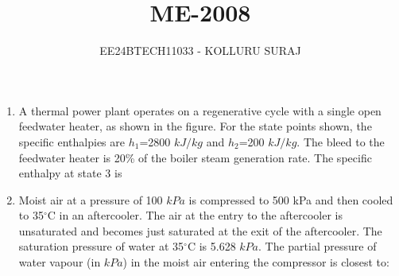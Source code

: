\documentclass[journal]{IEEEtran}
\numberwithin{equation}{enumi}
\numberwithin{figure}{enumi}
\begin{document}

\title{ME-2008}
\author{EE24BTECH11033 - KOLLURU SURAJ}
{\let\newpage\relax\maketitle}
\begin{enumerate}
\item A thermal power plant operates on a regenerative cycle with a single open feedwater heater, as shown in the figure. For the state points shown, the specific enthalpies are $h_1$=2800 $kJ/kg$ and $h_2$=200 $kJ/kg$. The bleed to the feedwater heater is 20\% of the boiler steam generation rate. The specific enthalpy at state 3 is
\hfill{}

\begin{enumerate}
\end{enumerate}
 
 \item Moist air at a pressure of 100 $kPa$ is compressed to 500 kPa and then cooled to 35$^\circ$C in an aftercooler. The air at the entry to the aftercooler is unsaturated and becomes just saturated at the exit of the aftercooler. The saturation pressure of water at 35$^\circ$C is 5.628 $kPa$. The partial pressure of water vapour (in $kPa$) in the moist air entering the compressor is closest to:
\hfill{}
\begin{enumerate}
    \begin{multicols}{4}


\end{multicols}
\end{enumerate}
\end{enumerate}
\end{document}

